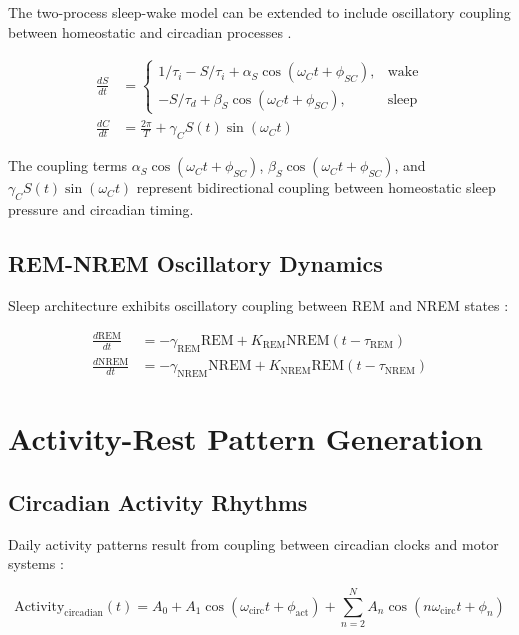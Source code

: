 \documentclass[twocolumn]{article}
\begin{document}
The two-process sleep-wake model can be extended to include oscillatory coupling between homeostatic and circadian processes \citep{borbely2016two,achermann2003mathematical}.

\begin{align}
\frac{dS}{dt} &= \begin{cases}
1/\tau_i - S/\tau_i + \alpha_S \cos(\omega_C t + \phi_{SC}), & \text{wake} \\
-S/\tau_d + \beta_S \cos(\omega_C t + \phi_{SC}), & \text{sleep}
\end{cases} \label{eq:homeostatic_coupled} \\
\frac{dC}{dt} &= \frac{2\pi}{T} + \gamma_C S(t) \sin(\omega_C t) \label{eq:circadian_coupled}
\end{align}

The coupling terms $\alpha_S \cos(\omega_C t + \phi_{SC})$, $\beta_S \cos(\omega_C t + \phi_{SC})$, and $\gamma_C S(t) \sin(\omega_C t)$ represent bidirectional coupling between homeostatic sleep pressure and circadian timing.

\subsection{REM-NREM Oscillatory Dynamics}

Sleep architecture exhibits oscillatory coupling between REM and NREM states \citep{mccarley2004neurobiology}:

\begin{align}
\frac{d\text{REM}}{dt} &= -\gamma_{\text{REM}} \text{REM} + K_{\text{REM}} \text{NREM}(t-\tau_{\text{REM}}) \label{eq:rem} \\
\frac{d\text{NREM}}{dt} &= -\gamma_{\text{NREM}} \text{NREM} + K_{\text{NREM}} \text{REM}(t-\tau_{\text{NREM}}) \label{eq:nrem}
\end{align}

\section{Activity-Rest Pattern Generation}

\subsection{Circadian Activity Rhythms}

Daily activity patterns result from coupling between circadian clocks and motor systems \citep{refinetti2006circadian}:

\begin{equation}
\text{Activity}_{\text{circadian}}(t) = A_0 + A_1 \cos(\omega_{\text{circ}} t + \phi_{\text{act}}) + \sum_{n=2}^N A_n \cos(n\omega_{\text{circ}} t + \phi_n)
\label{eq:circadian_activity}
\end{equation}
\end{document}
